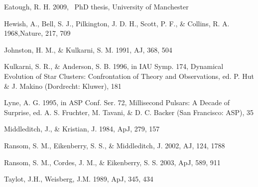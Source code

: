 

\begin{thebibliography}{}

Eatough, R. H. 2009, \ PhD thesis, University of 
Manchester


Hewish, A., Bell, S. J., Pilkington, J. D. 
H., Scott, P. F., \& Collins, R. A.  1968,Nature, 217, 709

Johnston, H. M., \& Kulkarni, S. M.  
1991, AJ, 368, 504

Kulkarni, S. R., \& Anderson, S. B. 
1996, in IAU Symp. 174, Dynamical Evolution of Star Clusters: Confrontation of 
Theory and Observations, ed. P. Hut \& J. Makino (Dordrecht: Kluwer), 181 

Lyne, A. G. 1995, in ASP Conf. Ser. 72, Millisecond 
Pulsars: A Decade of Surprise, ed. A. S. Fruchter, M. Tavani, \& D. C. Backer 
(San Francisco: ASP), 35

Middleditch, J., \& Kristian, J.  
1984, ApJ, 279, 157

Ransom, S. M., Eikenberry, S. S., \& Middleditch,
 J. 2002, AJ, 124, 1788

Ransom, S. M., Cordes, J. M., \& Eikenberry, S. S. 
2003,  ApJ, 589, 911

Taylot, J.H., Weisberg, J.M. 1989, ApJ, 345, 434


\end{thebibliography}
